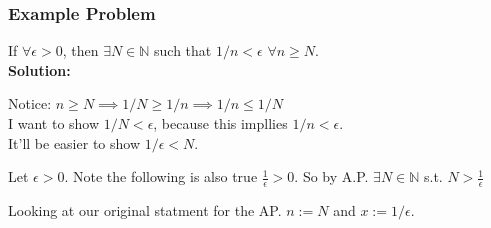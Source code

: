 \documentclass[12pt,fleqn]{article}
\numberwithin{equation}{section} %
\begin{document}
\subsubsection*{Example Problem}
If $\forall \epsilon > 0$, then $\exists N \in \mathbb N$ such that $1/n < \epsilon$ $\forall n \geq N$.\\
\textbf{Solution:}
\begin{sidework}
	Notice: $n \geq N \implies 1/N \geq 1/n \implies 1/n \leq 1/N$\\
	I want to show $1/N < \epsilon$, because this impllies $1/n  < \epsilon$.\\
	It'll be easier to show $1/\epsilon < N$.
\end{sidework}
Let $\epsilon > 0$. Note the following is also true $\frac{1}{\epsilon} > 0$. So by A.P. $\exists N \in \mathbb N$ s.t. $N > \frac{1}{\epsilon}$
\begin{sidework}
	Looking at our original statment for the AP. $n:= N$ and $x:= 1/\epsilon$.
\end{sidework}
\end{document}
